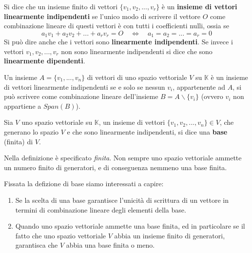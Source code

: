 \begin{defn}
	Si dice che un insieme finito di vettori $\{v_1, v_2, ..., v_r\}$ \`e
	un \textbf{insieme di vettori linearmente indipendenti} se l'unico
	modo di scrivere il vettore $O$ come combinazione lineare di questi
	vettori \`e con tutti i coefficienti nulli, ossia se
	\begin{equation*}
		a_1 v_1 + a_2 v_2 + ... + a_r v_r = O \quad \Leftrightarrow \quad
		a_1 = a_2 = ... = a_r = 0
	\end{equation*}
	Si pu\`o dire anche che i vettori sono \textbf{linearmente indipendenti}.
	Se invece i vettori $v_1, v_2, ..., v_r$ non sono linearmente indipendenti
	si dice che sono \textbf{linearmente dipendenti}.
\end{defn}

\begin{proposition}
	Un insieme $A = \{v_1, ..., v_n\}$ di vettori di uno spazio
	vettoriale $V$ su $\mathbb{K}$ \`e un insieme di vettori linearmente
	indipendenti se e solo se nessun $v_i$, appartenente ad $A$, si pu\`o
	scrivere come combinazione lineare dell'insieme
	$B = A \backslash \{v_i\}$ (ovvero $v_i$ non appartiene a $Span(B)$).
\end{proposition}

\begin{defn}
	Sia $V$ uno spazio vettoriale su $\mathbb{K}$, un insieme di vettori
	$\{v_1, v_2, ..., v_n\} \in V$, che generano lo spazio $V$ e che sono
	linearmente indipendenti, si dice una \textbf{base} (finita) di $V$.
\end{defn}

\begin{observation}
	Nella definizione \`e specificato \emph{finita}. Non sempre uno
	spazio vettoriale ammette un numero finito di generatori, e di
	conseguenza nemmeno una base finita.
\end{observation}

Fissata la defizione di base siamo interessati a capire:
\begin{enumerate}
	\item
	      Se la scelta di una base garantisce l'unicit\`a di scrittura di un vettore
	      in termini di combinazione lineare degli elementi della base.
	\item
	      Quando uno spazio vettoriale ammette una base finita, ed in
	      particolare se il fatto che uno spazio vettoriale $V$ abbia un
	      insieme finito di generatori, garantisca che $V$ abbia una
	      base finita o meno.
\end{enumerate}

